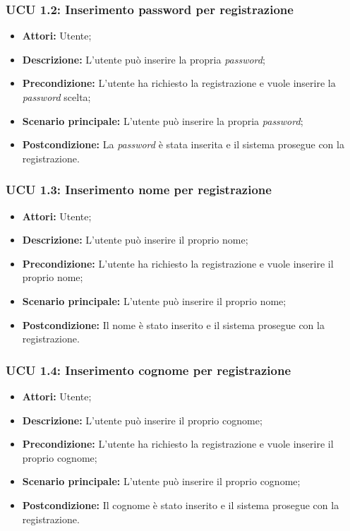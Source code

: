 \hypertarget{U1.2}{}
\subsubsection{UCU 1.2: Inserimento password per registrazione}
\begin{itemize}
	\item \textbf{Attori:} Utente;
	\item \textbf{Descrizione:} L'utente può inserire la propria \textit{password};
	\item \textbf{Precondizione:} L'utente ha richiesto la registrazione e vuole inserire la \textit{password} scelta;
	\item \textbf{Scenario principale:} L'utente può inserire la propria \textit{password};
	\item \textbf{Postcondizione:} La \textit{password} è stata inserita e il sistema prosegue con la registrazione.
\end{itemize}

\hypertarget{U1.3}{}
\subsubsection{UCU 1.3: Inserimento nome per registrazione}
\begin{itemize}
	\item \textbf{Attori:} Utente;
	\item \textbf{Descrizione:} L'utente può inserire il proprio nome;
	\item \textbf{Precondizione:} L'utente ha richiesto la registrazione e vuole inserire il proprio nome;
	\item \textbf{Scenario principale:} L'utente può inserire il proprio nome;
	\item \textbf{Postcondizione:} Il nome è stato inserito e il sistema prosegue con la registrazione.
\end{itemize}

\hypertarget{U1.4}{}
\subsubsection{UCU 1.4: Inserimento cognome per registrazione}
\begin{itemize}
	\item \textbf{Attori:} Utente;
	\item \textbf{Descrizione:} L'utente può inserire il proprio cognome;
	\item \textbf{Precondizione:} L'utente ha richiesto la registrazione e vuole inserire il proprio cognome;
	\item \textbf{Scenario principale:} L'utente può inserire il proprio cognome;
	\item \textbf{Postcondizione:} Il cognome è stato inserito e il sistema prosegue con la registrazione.
\end{itemize}

